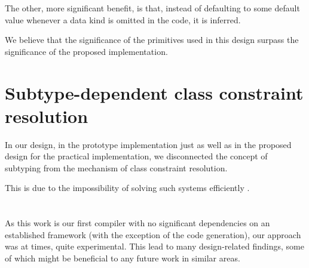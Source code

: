 The other, more significant benefit, is that, instead of defaulting to some default value whenever a data kind is omitted in the \cmm{} code, it is inferred.

We believe that the significance of the primitives used in this design surpass the significance of the proposed implementation. 

\section{Subtype-dependent class constraint resolution}

In our design, in the prototype implementation just as well as in the proposed design for the practical implementation, we disconnected the concept of subtyping from the mechanism of class constraint resolution.

This is due to the impossibility of solving such systems efficiently .

\section{}

As this work is our first compiler with no significant dependencies on an established framework (with the exception of the code generation), our approach was at times, quite experimental. This lead to many design-related findings, some of which might be beneficial to any future work in similar areas.

